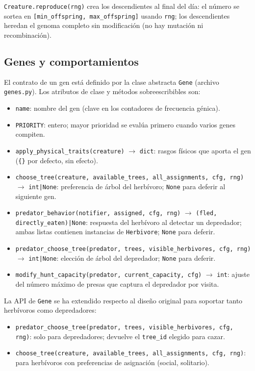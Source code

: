 \documentclass[11pt,a4paper]{article}
\begin{document}
\texttt{Creature.reproduce(rng)} crea los descendientes al final del d\'ia: el n\'umero se sortea en
\texttt{[min\_offspring, max\_offspring]} usando \texttt{rng}; los descendientes heredan el genoma
completo sin modificaci\'on (no hay mutaci\'on ni recombinaci\'on).

\subsection{Genes y comportamientos}\label{subsec:genes}

El contrato de un gen est\'a definido por la clase abstracta \texttt{Gene} (archivo \texttt{genes.py}).
Los atributos de clase y m\'etodos sobreescribibles son:
\begin{itemize}
	\item \texttt{name}: nombre del gen (clave en los contadores de frecuencia g\'enica).
	\item \texttt{PRIORITY}: entero; mayor prioridad se evalúa primero cuando varios genes compiten.
	\item \texttt{apply\_physical\_traits(creature)} $\to$ \texttt{dict}: rasgos f\'isicos que aporta el gen
	(\texttt{\{\}} por defecto, sin efecto).
	\item \texttt{choose\_tree(creature, available\_trees, all\_assignments, cfg, rng)} $\to$ \texttt{int|None}:
	preferencia de \'arbol del herb\'ivoro; \texttt{None} para deferir al siguiente gen.
	\item \texttt{predator\_behavior(notifier, assigned, cfg, rng)}
	$\to$ \texttt{(fled, directly\_eaten)|None}:
	respuesta del herb\'ivoro al detectar un depredador; ambas listas contienen instancias de
	\texttt{Herbivore}; \texttt{None} para deferir.
	\item \texttt{predator\_choose\_tree(predator, trees, visible\_herbivores, cfg, rng)} $\to$ \texttt{int|None}:
	elecci\'on de \'arbol del depredador; \texttt{None} para deferir.
	\item \texttt{modify\_hunt\_capacity(predator, current\_capacity, cfg)} $\to$ \texttt{int}:
	ajuste del n\'umero m\'aximo de presas que captura el depredador por visita.
\end{itemize}

La API de \texttt{Gene} se ha extendido respecto al dise\~no original para soportar tanto herb\'ivoros como depredadores:
\begin{itemize}
	\item \texttt{predator\_choose\_tree(predator, trees, visible\_herbivores, cfg, rng)}: solo para depredadores;
	devuelve el \texttt{tree\_id} elegido para cazar.
	\item \texttt{choose\_tree(creature, available\_trees, all\_assignments, cfg, rng)}: para herb\'ivoros con
	preferencias de asignaci\'on (social, solitario).
\end{itemize}
\end{document}
